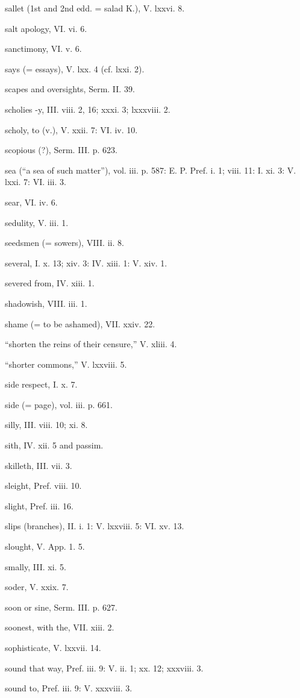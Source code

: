 sallet (1st and 2nd edd. = salad K.), V. lxxvi. 8.

salt apology, VI. vi. 6.

sanctimony, VI. v. 6.

says (= essays), V. lxx. 4 (cf. lxxi. 2).

scapes and oversights, Serm. II. 39.

scholies -y, III. viii. 2, 16; xxxi. 3; lxxxviii. 2.

scholy, to (v.), V. xxii. 7: VI. iv. 10.

scopious (?), Serm. III. p. 623.

sea (“a sea of such matter”), vol. iii. p. 587: E. P. Pref. i. 1; viii. 11: I. xi. 3: V. lxxi. 7: VI. iii. 3.

sear, VI. iv. 6.

sedulity, V. iii. 1.

seedsmen (= sowers), VIII. ii. 8.

several, I. x. 13; xiv. 3: IV. xiii. 1: V. xiv. 1.

severed from, IV. xiii. 1.

shadowish, VIII. iii. 1.

shame (= to be ashamed), VII. xxiv. 22.

“shorten the reins of their censure,” V. xliii. 4.

“shorter commons,” V. lxxviii. 5.

side respect, I. x. 7.

side (= page), vol. iii. p. 661.

silly, III. viii. 10; xi. 8.

sith, IV. xii. 5 and passim.

skilleth, III. vii. 3.

sleight, Pref. viii. 10.

slight, Pref. iii. 16.

slips (branches), II. i. 1: V. lxxviii. 5: VI. xv. 13.

slought, V. App. 1. 5.

smally, III. xi. 5.

soder, V. xxix. 7.

soon or sine, Serm. III. p. 627.

soonest, with the, VII. xiii. 2.

sophisticate, V. lxxvii. 14.

sound that way, Pref. iii. 9: V. ii. 1; xx. 12; xxxviii. 3.

sound to, Pref. iii. 9: V. xxxviii. 3.


